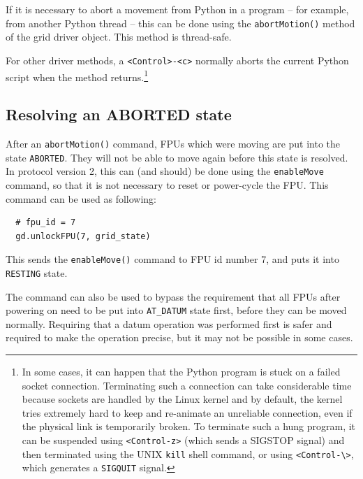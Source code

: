 \documentclass[fontsize=12,a4paper]{scrreprt}
\begin{document}
If it is necessary to abort a movement from Python in a program -- for
example, from another Python thread -- this can be done using the
\texttt{abortMotion()} method of the grid driver object.  This method
is thread-safe.

For other driver methods, a \verb+<Control>-<c>+ normally aborts the
current Python script when the method returns.\footnote{
  In some cases, it
  can happen that the Python program is stuck on a failed socket
  connection. Terminating such a connection can take considerable time
  because sockets are handled by the Linux kernel and by default, the
  kernel tries extremely hard to keep and re-animate an unreliable
  connection, even if the physical link is temporarily broken. To
  terminate such a hung program, it can be suspended using
  \texttt{<Control-z>} (which sends a SIGSTOP signal) and then
  terminated using the UNIX \texttt{kill} shell command, or using
  \texttt{<Control-\textbackslash>}, which generates a
  \texttt{SIGQUIT} signal.}


\subsection{Resolving an ABORTED state}
\label{sec:useanableMove}
After an \texttt{abortMotion()} command, FPUs which were moving are
put into the state \texttt{ABORTED}. They will not be able to move
again before this state is resolved. In protocol version 2, this can
(and should) be done using the \texttt{enableMove} command, so that it
is not necessary to reset or power-cycle the FPU. This command
can be used as following:

\begin{verbatim}
  # fpu_id = 7
  gd.unlockFPU(7, grid_state)
\end{verbatim}

This sends the \texttt{enableMove()} command to FPU id number 7, and
puts it into \texttt{RESTING} state.

The command can also be used to bypass the requirement that all FPUs
after powering on need to be put into \texttt{AT\_DATUM} state first,
before they can be moved normally. Requiring that a datum operation
was performed first is safer and required to make the operation
precise, but it may not be possible in some cases.
\end{document}
